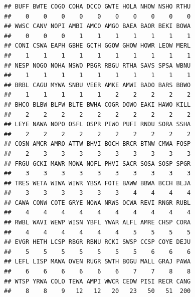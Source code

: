 \documentclass[12pt,]{scrbook}
\newenvironment{Shaded}{\begin{snugshade}}{\end{snugshade}}
\newcommand{\CommentTok}[1]{\textcolor[rgb]{0.56,0.35,0.01}{\textit{#1}}}
\newcommand{\DecValTok}[1]{\textcolor[rgb]{0.00,0.00,0.81}{#1}}
\newcommand{\KeywordTok}[1]{\textcolor[rgb]{0.13,0.29,0.53}{\textbf{#1}}}
\newcommand{\NormalTok}[1]{#1}
\newcommand{\OperatorTok}[1]{\textcolor[rgb]{0.81,0.36,0.00}{\textbf{#1}}}
\newcommand{\StringTok}[1]{\textcolor[rgb]{0.31,0.60,0.02}{#1}}
\begin{document}
\begin{verbatim}
## BUFF BWTE COGO COHA DCCO GWTE HOLA NHOW NSHO RTHU 
##    0    0    0    0    0    0    0    0    0    0 
## WWSC CANV NOPI AMBI AMCO AMGO BAEA BAOR BEKI BOWA 
##    0    0    0    1    1    1    1    1    1    1 
## CONI CSWA EAPH GBHE GCTH GGOW GHOW HOWR LEOW MERL 
##    1    1    1    1    1    1    1    1    1    1 
## NESP NOGO NOHA NSWO PBGR RBGU RTHA SAVS SPSA WBNU 
##    1    1    1    1    1    1    1    1    1    1 
## BRBL CAGU MYWA SNBU VEER AMKE AMWI BADO BARS BBWO 
##    1    1    1    1    1    2    2    2    2    2 
## BHCO BLBW BLPW BLTE BWHA COGR DOWO EAKI HAWO KILL 
##    2    2    2    2    2    2    2    2    2    2 
## LEYE NAWA NOPO OSFL OSPR PIWO PUFI RNDU SORA SSHA 
##    2    2    2    2    2    2    2    2    2    2 
## COSN AMCR AMRO ATTW BHVI BOCH BRCR BTNW CMWA FOSP 
##    2    3    3    3    3    3    3    3    3    3 
## FRGU GCKI MAWR MOWA NOFL PHVI SACR SOSA SOSP SPGR 
##    3    3    3    3    3    3    3    3    3    3 
## TRES WETA WIWA WIWR YBSA FOTE BAWW BBWA BCCH BLJA 
##    3    3    3    3    3    3    4    4    4    4 
## CAWA CONW COTE GRYE NOWA NRWS OCWA REVI RNGR RUBL 
##    4    4    4    4    4    4    4    4    4    4 
## RWBL WAVI WEWP WISN YBFL YWAR ALFL AMRE CHSP CORA 
##    4    4    4    4    4    4    5    5    5    5 
## EVGR HETH LCSP RBGR RBNU RCKI SWSP CCSP COYE DEJU 
##    5    5    5    5    5    5    5    6    6    6 
## LEFL LISP MAWA OVEN RUGR SWTH BOGU MALL GRAJ PAWA 
##    6    6    6    6    6    6    7    7    8    8 
## WTSP YRWA COLO TEWA AMPI WWCR CEDW PISI RECR CANG 
##    8    8    9   12   12   20   23   50   51  200
\end{verbatim}

\begin{Shaded}
\end{Shaded}
\end{document}

